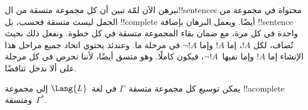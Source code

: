 \documentclass[../../../include/open-logic-section]{subfiles}
\begin{document}
      {}
      {}


\begin{explain}
نبرهن الآن لمّة تبين أن كل مجموعة متسقة من ال!!{sentence}s محتواة في
مجموعة من الجمل ليست متسقة فحسب، بل !!{complete} أيضًا. ويعمل البرهان
بإضافة !!{sentence} واحدة في كل مرة، مع ضمان بقاء المجموعة متسقة في
كل خطوة. ونفعل ذلك بحيث تُضاف، لكل $!A$، إما $!A$ وإما $\lnot !A$ في
مرحلة ما. وعندئذ يحتوي اتحاد جميع مراحل هذا الإنشاء إما $!A$ وإما
نفيها~$\lnot !A$، فيكون كاملًا. وهو متسق أيضًا، لأننا نحرص في كل مرحلة
على ألا ندخل تناقضًا.
\end{explain}

\begin{lem}[لمّة ليندنبوم]
 يمكن توسيع كل مجموعة متسقة~$\Gamma$ في
لغة~$\Lang{L}$ إلى مجموعة !!a{complete} ومتسقة~$\Gamma^*$.
\end{lem}
\end{document}
